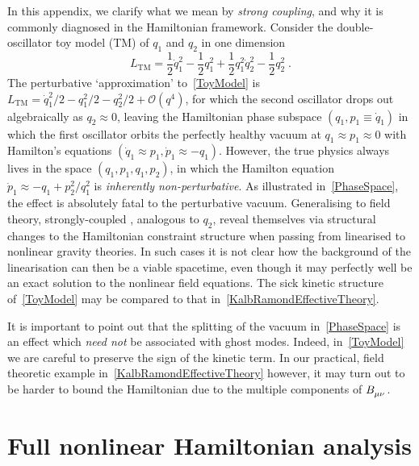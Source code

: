 \documentclass[aps,prd,reprint,preprintnumbers,showpacs,floatfix,nofootinbib,superscript address,longbibliography]{revtex4-1}
\begin{document}
In this appendix, we clarify what we mean by \emph{strong coupling}, and why it is commonly diagnosed in the Hamiltonian framework. Consider the double-oscillator toy model (TM) of \dof $q_1$ and $q_2$ in one dimension
\begin{equation}\label{ToyModel}
	L_{\text{TM}}=\frac{1}{2}\dot{q}_1^2-\frac{1}{2}q_1^2+\frac{1}{2}q_1^2\dot{q}_2^2-\frac{1}{2}q_2^2 \;.
\end{equation}
The perturbative `approximation' to~\cref{ToyModel} is $L_{\text{TM}}=\dot{q}_1^2/2-q_1^2/2-q_2^2/2+\mathcal{O}\left(q^4\right)$, for which the second oscillator drops out algebraically as $q_2\approx 0$, leaving the Hamiltonian phase subspace $\left(q_1,p_1\equiv\dot{q}_1\right)$ in which the first oscillator orbits the perfectly healthy vacuum at $q_1\approx p_1\approx 0$ with Hamilton's equations $\left(\dot{q}_1\approx p_1,\dot{p}_1\approx-q_1\right)$. However, the true physics always lives in the space $\left(q_1,p_1,q_1,p_2\right)$, in which the Hamilton equation $\dot{p}_1\approx -q_1+p_2^2/q_1^2$ is \emph{inherently non-perturbative}. As illustrated in~\cref{PhaseSpace}, the effect is absolutely fatal to the perturbative vacuum. Generalising to field theory, strongly-coupled \dof, analogous to $q_2$, reveal themselves via structural changes to the Hamiltonian constraint structure when passing from linearised to nonlinear gravity theories. In such cases it is not clear how the background of the linearisation can then be a viable spacetime, even though it may perfectly well be an exact solution to the nonlinear field equations. The sick kinetic structure of~\eqref{ToyModel} may be compared to that in~\eqref{KalbRamondEffectiveTheory}.

It is important to point out that the splitting of the vacuum in~\cref{PhaseSpace} is an effect which \emph{need not} be associated with ghost modes. Indeed, in~\cref{ToyModel} we are careful to preserve the sign of the kinetic term. In our practical, field theoretic example in~\cref{KalbRamondEffectiveTheory} however, it may turn out to be harder to bound the Hamiltonian due to the multiple components of $\B{_{\mu\nu}}$. 

\section{Full nonlinear Hamiltonian analysis}\label{FullAnalysis}
\end{document}
